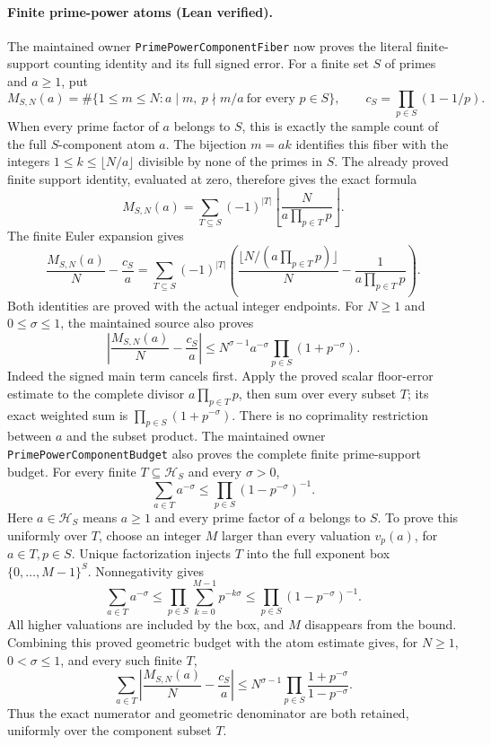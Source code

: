 \documentclass[11pt]{article}
\theoremstyle{definition}
\begin{document}
\paragraph{Finite prime-power atoms (Lean verified).}
The maintained owner \texttt{PrimePowerComponentFiber} now proves the
literal finite-support counting identity and its full signed error.
For a finite set \(S\) of primes and \(a\ge1\), put
\[
 M_{S,N}(a)=\#\{1\le m\le N:a\mid m,\
                   p\nmid m/a\ \text{for every }p\in S\},\qquad
 c_S=\prod_{p\in S}(1-1/p).
\]
When every prime factor of \(a\) belongs to \(S\), this is exactly the
sample count of the full \(S\)-component atom \(a\).
The bijection \(m=ak\) identifies this fiber with the integers
\(1\le k\le\lfloor N/a\rfloor\) divisible by none of the primes in \(S\).
The already proved finite support identity, evaluated at zero, therefore
gives the exact formula
\[
 M_{S,N}(a)=\sum_{T\subseteq S}(-1)^{|T|}
                    \left\lfloor\frac{N}{a\prod_{p\in T}p}\right\rfloor.
\]
The finite Euler expansion gives
\[
 \frac{M_{S,N}(a)}N-\frac{c_S}a
 =\sum_{T\subseteq S}(-1)^{|T|}
   \left(\frac{\lfloor N/(a\prod_{p\in T}p)\rfloor}{N}
                   -\frac1{a\prod_{p\in T}p}\right).
\]
Both identities are proved with the actual integer endpoints.
For \(N\ge1\) and \(0\le\sigma\le1\), the maintained source also proves
\[
 \left|\frac{M_{S,N}(a)}N-\frac{c_S}a\right|
 \le N^{\sigma-1}a^{-\sigma}\prod_{p\in S}(1+p^{-\sigma}).
\]
Indeed the signed main term cancels first. Apply the proved scalar
floor-error estimate to the complete divisor \(a\prod_{p\in T}p\),
then sum over every subset \(T\); its exact weighted sum is
\(\prod_{p\in S}(1+p^{-\sigma})\).
There is no coprimality restriction between \(a\) and the subset product.
The maintained owner \texttt{PrimePowerComponentBudget} also proves the
complete finite prime-support budget. For every finite
\(T\subseteq\mathcal H_S\) and every \(\sigma>0\),
\[
 \sum_{a\in T}a^{-\sigma}
       \le\prod_{p\in S}(1-p^{-\sigma})^{-1}.
\]
Here \(a\in\mathcal H_S\) means \(a\ge1\) and every prime factor of
\(a\) belongs to \(S\). To prove this uniformly over \(T\), choose an
integer \(M\) larger than every valuation \(v_p(a)\), for
\(a\in T,p\in S\). Unique factorization injects \(T\) into the full
exponent box \(\{0,\ldots,M-1\}^{S}\). Nonnegativity gives
\[
 \sum_{a\in T}a^{-\sigma}
 \le\prod_{p\in S}\sum_{k=0}^{M-1}p^{-k\sigma}
 \le\prod_{p\in S}(1-p^{-\sigma})^{-1}.
\]
All higher valuations are included by the box, and \(M\) disappears from
the bound. Combining this proved geometric budget with the atom estimate
gives, for \(N\ge1\), \(0<\sigma\le1\), and every such finite \(T\),
\[
 \sum_{a\in T}
       \left|\frac{M_{S,N}(a)}N-\frac{c_S}a\right|
 \le N^{\sigma-1}
           \prod_{p\in S}\frac{1+p^{-\sigma}}{1-p^{-\sigma}}.
\]
Thus the exact numerator and geometric denominator are both retained,
uniformly over the component subset \(T\).
\end{document}
